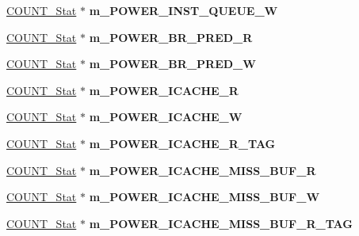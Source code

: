 \begin{DoxyCompactItemize}
\item 
\hypertarget{classall__stats__c_a70686ae295c4999f67b01703a6f6fcfc}{
\hyperlink{classCOUNT__Stat}{COUNT\_\-Stat} $\ast$ {\bfseries m\_\-POWER\_\-INST\_\-QUEUE\_\-W}}
\label{classall__stats__c_a70686ae295c4999f67b01703a6f6fcfc}

\item 
\hypertarget{classall__stats__c_ad7774381bd913b53807cd7f595ce0ea4}{
\hyperlink{classCOUNT__Stat}{COUNT\_\-Stat} $\ast$ {\bfseries m\_\-POWER\_\-BR\_\-PRED\_\-R}}
\label{classall__stats__c_ad7774381bd913b53807cd7f595ce0ea4}

\item 
\hypertarget{classall__stats__c_a12df6561028bdb3da223088aab3cb3eb}{
\hyperlink{classCOUNT__Stat}{COUNT\_\-Stat} $\ast$ {\bfseries m\_\-POWER\_\-BR\_\-PRED\_\-W}}
\label{classall__stats__c_a12df6561028bdb3da223088aab3cb3eb}

\item 
\hypertarget{classall__stats__c_a105244fd1c849d59f33c178933a7c535}{
\hyperlink{classCOUNT__Stat}{COUNT\_\-Stat} $\ast$ {\bfseries m\_\-POWER\_\-ICACHE\_\-R}}
\label{classall__stats__c_a105244fd1c849d59f33c178933a7c535}

\item 
\hypertarget{classall__stats__c_abcd72c718406b2294b6f6e5db7143ac7}{
\hyperlink{classCOUNT__Stat}{COUNT\_\-Stat} $\ast$ {\bfseries m\_\-POWER\_\-ICACHE\_\-W}}
\label{classall__stats__c_abcd72c718406b2294b6f6e5db7143ac7}

\item 
\hypertarget{classall__stats__c_a7fc0f1ac29b5e7927e9cc825c04def4e}{
\hyperlink{classCOUNT__Stat}{COUNT\_\-Stat} $\ast$ {\bfseries m\_\-POWER\_\-ICACHE\_\-R\_\-TAG}}
\label{classall__stats__c_a7fc0f1ac29b5e7927e9cc825c04def4e}

\item 
\hypertarget{classall__stats__c_a5d45f6e7b93e77c58c49238c4f1f58fa}{
\hyperlink{classCOUNT__Stat}{COUNT\_\-Stat} $\ast$ {\bfseries m\_\-POWER\_\-ICACHE\_\-MISS\_\-BUF\_\-R}}
\label{classall__stats__c_a5d45f6e7b93e77c58c49238c4f1f58fa}

\item 
\hypertarget{classall__stats__c_a66cc083d553838675185b4a775846579}{
\hyperlink{classCOUNT__Stat}{COUNT\_\-Stat} $\ast$ {\bfseries m\_\-POWER\_\-ICACHE\_\-MISS\_\-BUF\_\-W}}
\label{classall__stats__c_a66cc083d553838675185b4a775846579}

\item 
\hypertarget{classall__stats__c_a566232ad458b767cb58f5533502a92d7}{
\hyperlink{classCOUNT__Stat}{COUNT\_\-Stat} $\ast$ {\bfseries m\_\-POWER\_\-ICACHE\_\-MISS\_\-BUF\_\-R\_\-TAG}}
\label{classall__stats__c_a566232ad458b767cb58f5533502a92d7}


\end{DoxyCompactItemize}
